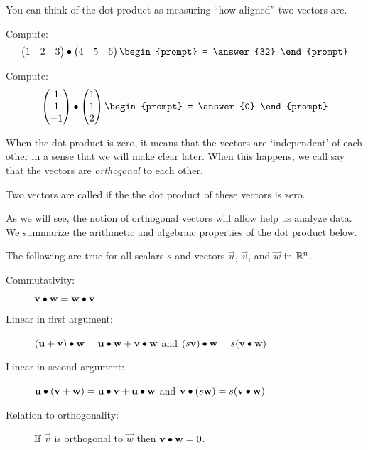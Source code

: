 \documentclass{ximera}
\begin{document}
You can think of the dot product as measuring ``how aligned'' two vectors are.
\begin{question}
  Compute:
  \[
  \begin{pmatrix}1 & 2 & 3\end{pmatrix}\dotp\begin{pmatrix}4 & 5 & 6\end{pmatrix}
  \begin{prompt}
    = \answer{32}
  \end{prompt}
  \]
\end{question}



\begin{question}
  Compute:
  \[
  \begin{pmatrix}1\\1\\-1\end{pmatrix}\dotp\begin{pmatrix}1\\1\\2\end{pmatrix}
  \begin{prompt}
    = \answer{0}
  \end{prompt}
  \]
\end{question}
When the dot product is zero, it means that the vectors are
`independent' of each other in a sense that we will make clear
later. When this happens, we call say that the vectors are
\textit{orthogonal} to each other.

\begin{definition}
  Two vectors are called  if the the dot product of
  these vectors is zero.
\end{definition}


As we will see, the notion of orthogonal vectors will allow help us analyze data.
We summarize the arithmetic and algebraic properties of the dot
product below.
\begin{theorem}
  The following are true for all scalars $s$ and vectors
  $\vec{u}$, $\vec{v}$, and $\vec{w}$ in $\mathbb{R}^n$.
  \begin{description}
  \item[Commutativity:] $\mathbf{v} \bullet \mathbf{w} = \mathbf{w} \bullet
    \mathbf{v}$
  \item[Linear in first argument:] $(\mathbf{u}+\mathbf{v})\bullet \mathbf{w} = \mathbf{u}\bullet \mathbf{w} +
    \mathbf{v}\bullet \mathbf{w}$ and $(s\mathbf{v})\bullet \mathbf{w} = s(\mathbf{v}
    \bullet \mathbf{w})$
  \item[Linear in second argument:] $\mathbf{u} \bullet (\mathbf{v}+\mathbf{w}) = \mathbf{u}\bullet \mathbf{v}+
    \mathbf{u}\bullet \mathbf{w}$ and $\mathbf{v} \bullet (s\mathbf{w}) = s(\mathbf{v}
    \bullet \mathbf{w})$
  \item[Relation to orthogonality:] If $\vec{v}$ is orthogonal to
    $\vec{w}$ then $\mathbf{v} \bullet \mathbf{w} = 0$.
  \end{description}
\end{theorem}
\end{document}
